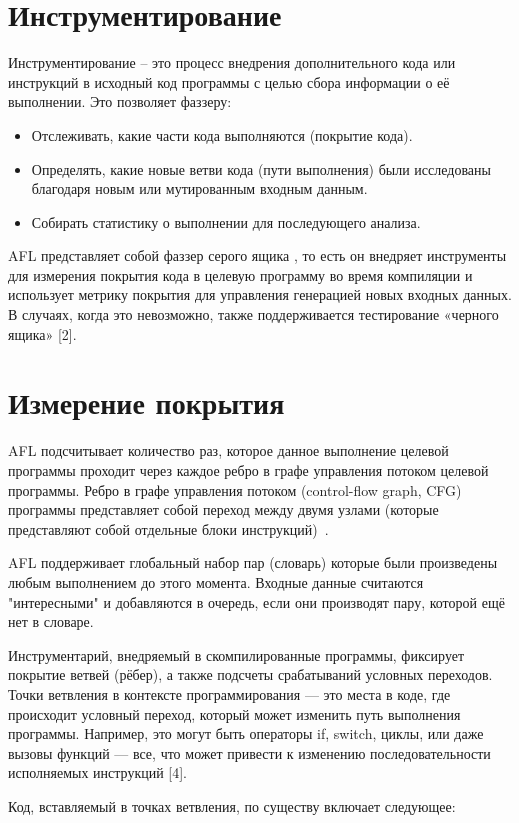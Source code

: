 \section{Инструментирование} \label{ch3:sec1}
Инструментирование – это процесс внедрения дополнительного кода или инструкций в исходный код программы с целью сбора информации о её выполнении.
Это позволяет фаззеру:
\begin{itemize}
	\item Отслеживать, какие части кода выполняются (покрытие кода).
	\item Определять, какие новые ветви кода (пути выполнения) были исследованы благодаря новым или мутированным входным данным.
	\item Собирать статистику о выполнении для последующего анализа.
\end{itemize}
\par
AFL представляет собой фаззер серого ящика , то есть он внедряет инструменты для измерения покрытия кода в целевую программу во время компиляции и использует метрику покрытия для управления генерацией новых входных данных.
В случаях, когда это невозможно, также поддерживается тестирование «черного ящика» [2].

\section{Измерение покрытия} \label{ch3:sec2}
AFL подсчитывает количество раз, которое данное выполнение целевой программы проходит через каждое ребро в графе управления потоком целевой программы. Ребро в графе управления потоком (control-flow graph, CFG) программы представляет собой переход между двумя узлами (которые представляют собой отдельные блоки инструкций)~\cite{???}. 
\par
AFL поддерживает глобальный набор пар (словарь) которые были произведены любым выполнением до этого момента. Входные данные считаются "интересными" и добавляются в очередь, если они производят пару, которой ещё нет в словаре.
\par
Инструментарий, внедряемый в скомпилированные программы, фиксирует покрытие ветвей (рёбер), а также подсчеты срабатываний условных переходов. Точки ветвления в контексте программирования — это места в коде, где происходит условный переход, который может изменить путь выполнения программы. Например, это могут быть операторы if, switch, циклы, или даже вызовы функций — все, что может привести к изменению последовательности исполняемых инструкций [4]. 
\par
Код, вставляемый в точках ветвления, по существу включает следующее:

